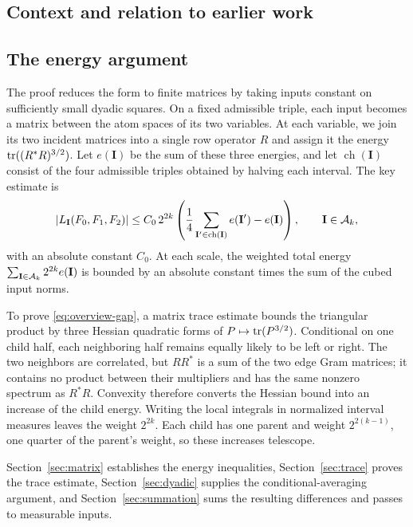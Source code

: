 \subsection{Context and relation to earlier work}


\subsection{The energy argument}

The proof reduces the form to finite matrices by taking inputs constant
on sufficiently small dyadic squares. On a fixed admissible triple,
each input becomes a matrix between the atom spaces of its two
variables. At each variable, we join its two incident matrices into a
single row operator \(R\) and assign it the energy
\(\operatorname{tr}((R^*R)^{3/2})\). Let \(e(\mathbf I)\) be the sum of these three
energies, and let \(\operatorname{ch}(\mathbf I)\) consist of the four
admissible triples obtained by halving each interval. The key estimate
is
\begin{equation}\label{eq:overview-gap}
 \lvert L_{\mathbf I}(F_0,F_1,F_2)\rvert
 \le C_0\,2^{2k}
 \left(\frac14\sum_{\mathbf I'\in\operatorname{ch}(\mathbf I)}
                 e(\mathbf I')-e(\mathbf I)\right),
 \qquad \mathbf I\in\mathcal A_k,
\end{equation}
with an absolute constant \(C_0\). At each scale, the weighted total
energy \(\sum_{\mathbf I\in\mathcal A_k}2^{2k}e(\mathbf I)\) is bounded by an
absolute constant times the sum of the cubed input norms.

To prove \eqref{eq:overview-gap}, a matrix trace estimate bounds
the triangular product by three Hessian quadratic forms of
\(P\mapsto\operatorname{tr}(P^{3/2})\). Conditional on one child half, each neighboring
half remains equally likely to be left or right. The two neighbors are
correlated, but \(RR^*\)
is a sum of the two edge Gram matrices; it contains no product between
their multipliers and has the same nonzero spectrum as \(R^*R\).
Convexity therefore converts the Hessian bound into an increase of the
child energy. Writing the local integrals in normalized interval
measures leaves the weight \(2^{2k}\). Each child has one parent and
weight \(2^{2(k-1)}\), one quarter of the parent's weight, so these
increases telescope.

Section~\ref{sec:matrix} establishes the energy
inequalities, Section~\ref{sec:trace} proves the trace estimate,
Section~\ref{sec:dyadic} supplies the conditional-averaging argument,
and Section~\ref{sec:summation} sums the resulting differences and
passes to measurable inputs.
